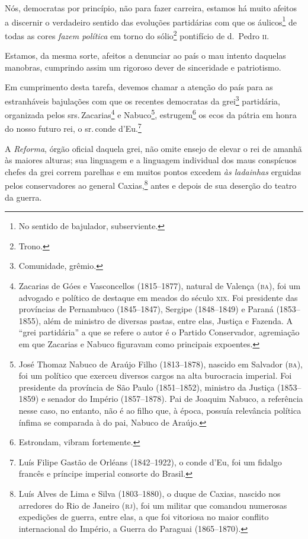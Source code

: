 Nós, democratas por princípio, não para fazer carreira, estamos há muito
afeitos a discernir o verdadeiro sentido das evoluções partidárias com
que os áulicos\footnote{No sentido de bajulador, subserviente.} de
todas as cores \emph{fazem política} em torno do sólio\footnote{Trono.}
pontifício de d.~Pedro \textsc{ii}.

Estamos, da mesma sorte, afeitos a denunciar ao país o mau intento
daquelas manobras, cumprindo assim um rigoroso dever de sinceridade e
patriotismo.

Em cumprimento desta tarefa, devemos chamar a atenção do país para as
estranháveis bajulações com que os recentes democratas da
grei\footnote{Comunidade, grêmio.} partidária, organizada pelos srs.\,Zacarias\footnote{Zacarias de Góes e Vasconcellos (1815--1877), natural
  de Valença (\textsc{ba}), foi um advogado e político de destaque em meados do
  século \textsc{xix}. Foi presidente das províncias de Pernambuco (1845--1847),
  Sergipe (1848--1849) e Paraná (1853--1855), além de ministro de diversas
  pastas, entre elas, Justiça e Fazenda. A ``grei partidária'' a que se
  refere o autor é o Partido Conservador, agremiação em que Zacarias e
  Nabuco figuravam como principais expoentes.} e Nabuco\footnote{José
  Thomaz Nabuco de Araújo Filho (1813--1878), nascido em Salvador (\textsc{ba}),
  foi um político que exerceu diversos cargos na alta burocracia
  imperial. Foi presidente da província de São Paulo (1851--1852),
  ministro da Justiça (1853--1859) e senador do Império (1857--1878). Pai
  de Joaquim Nabuco, a referência nesse caso, no entanto, não é ao filho
  que, à época, possuía relevância política ínfima se comparada à do
  pai, Nabuco de Araújo.}, estrugem\footnote{Estrondam, vibram
  fortemente.} os ecos da pátria em honra do nosso futuro rei, o sr.\,conde d'Eu.\footnote{Luís Filipe Gastão de Orléans (1842--1922), o conde
  d'Eu, foi um fidalgo francês e príncipe imperial consorte do Brasil.}

A \emph{Reforma}, órgão oficial daquela grei, não omite ensejo de elevar
o rei de amanhã às maiores alturas; sua linguagem e a linguagem
individual dos maus conspícuos chefes da grei correm parelhas e em
muitos pontos excedem \emph{às ladainhas} erguidas pelos conservadores
ao general Caxias,\footnote{Luís Alves de Lima e Silva (1803--1880), o
  duque de Caxias, nascido nos arredores do Rio de Janeiro (\textsc{rj}), foi um
  militar que comandou numerosas expedições de guerra, entre elas, a que
  foi vitoriosa no maior conflito internacional do Império, a Guerra do
  Paraguai (1865--1870).} antes e depois de sua deserção do teatro da
guerra.


